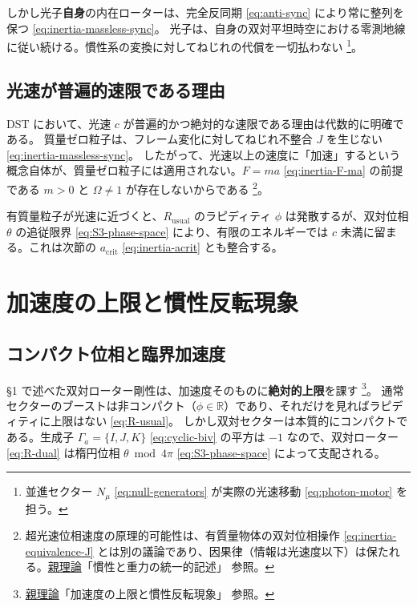 \documentclass[dvipdfmx,a4paper,oneside]{jsbook}
\numberwithin{equation}{chapter}
\begin{document}
しかし光子\textbf{自身}の内在ローターは、完全反同期 \eqref{eq:anti-sync} により常に整列を保つ \eqref{eq:inertia-massless-sync}。
光子は、自身の双対平坦時空における零測地線に従い続ける。慣性系の変換に対してねじれの代償を一切払わない \footnote{並進セクター \(N_\mu\) \eqref{eq:null-generators} が実際の光速移動 \eqref{eq:photon-motor} を担う。}。

\subsection{光速が普遍的速限である理由}

DST において、光速 \(c\) が普遍的かつ絶対的な速限である理由は代数的に明確である。
質量ゼロ粒子は、フレーム変化に対してねじれ不整合 \(J\) を生じない \eqref{eq:inertia-massless-sync}。
したがって、光速以上の速度に「加速」するという概念自体が、質量ゼロ粒子には適用されない。\(F = ma\) \eqref{eq:inertia-F-ma} の前提である \(m > 0\) と \(\Omega \neq 1\) が存在しないからである \footnote{超光速位相速度の原理的可能性は、有質量物体の双対位相操作 \eqref{eq:inertia-equivalence-J} とは別の議論であり、因果律（情報は光速度以下）は保たれる。\hyperref[sec:sister-manuscripts]{親理論}「慣性と重力の統一的記述」 参照。}。

有質量粒子が光速に近づくと、\(R_{\mathrm{usual}}\) のラピディティ \(\phi\) は発散するが、双対位相 \(\theta\) の追従限界 \eqref{eq:S3-phase-space} により、有限のエネルギーでは \(c\) 未満に留まる。これは次節の \(a_{\mathrm{crit}}\) \eqref{eq:inertia-acrit} とも整合する。

\section{加速度の上限と慣性反転現象}

\subsection{コンパクト位相と臨界加速度}

§1 で述べた双対ローター剛性は、加速度そのものに\textbf{絶対的上限}を課す \footnote{\hyperref[sec:sister-manuscripts]{親理論}「加速度の上限と慣性反転現象」 参照。}。
通常セクターのブーストは非コンパクト（\(\phi \in \mathbb{R}\)）であり、それだけを見ればラピディティに上限はない \eqref{eq:R-usual}。
しかし双対セクターは本質的にコンパクトである。生成子 \(\Gamma_a = \{I, J, K\}\) \eqref{eq:cyclic-biv} の平方は \(-1\) なので、双対ローター \eqref{eq:R-dual} は楕円位相 \(\theta \bmod 4\pi\) \eqref{eq:S3-phase-space} によって支配される。
\end{document}
